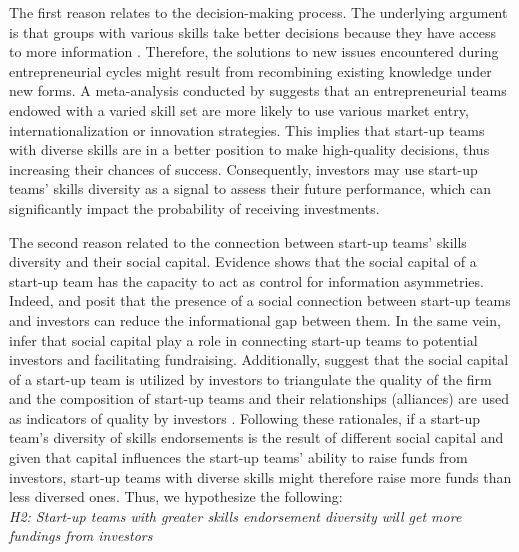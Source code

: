 \documentclass[12pt]{article}
\begin{document}
The first reason relates to the decision-making process. The underlying argument is that groups with various skills take better decisions because they have access to more information \citep{hong2001problem}. Therefore, the solutions to new issues encountered during entrepreneurial cycles might result from recombining existing knowledge under new forms. A meta-analysis conducted by \citet{jin2017entrepreneurial} suggests that an entrepreneurial teams endowed with a varied skill set are more likely to use various market entry, internationalization or innovation strategies. This implies that start-up teams with diverse skills are in a better position to make high-quality decisions, thus increasing their chances of success. Consequently, investors may use start-up teams' skills diversity as a signal to assess their future performance, which can significantly impact the probability of receiving investments.

The second reason related to the connection between start-up teams' skills diversity and their social capital. Evidence shows that the social capital of a start-up team has the capacity to act as control for information asymmetries. Indeed, \citet{huang2017resources} and \citet{shane2002organizational} posit that the presence of a social connection between start-up teams and investors can reduce the informational gap between them. In the same vein, \citet{shane2002network} infer that social capital play a role in connecting start-up teams to potential investors and facilitating fundraising. Additionally, \citet{hoenig2015quality} suggest that the social capital of a start-up team is utilized by investors to triangulate the quality of the firm and the composition of start-up teams and their relationships (alliances) are used as indicators of quality by investors \citep{plummer2016better, semrau2014exactly}. Following these rationales, if a start-up team's diversity of skills endorsements is the result of different social capital and given that capital influences the start-up teams' ability to raise funds from investors, start-up teams with diverse skills might therefore raise more funds than less diversed ones. Thus, we hypothesize the following: \\

\noindent \textit{H2: Start-up teams with greater skills endorsement diversity will get more fundings from investors} \\
\end{document}
